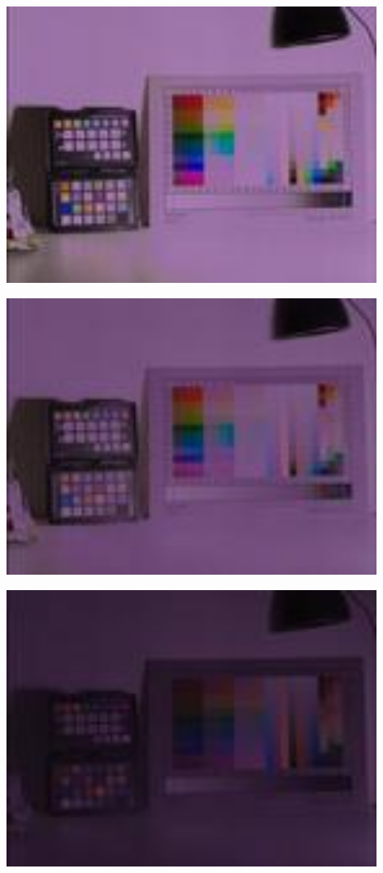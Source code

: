 \begin{center}
\includegraphics[height=9cm]{images/100ms-1ms-32-tiny}
\end{center}

\begin{center}
\includegraphics[height=9cm]{images/100ms-1ms-40-tiny}
\end{center}

\begin{center}
\includegraphics[height=9cm]{images/100ms-1ms-48-tiny}
\end{center}

